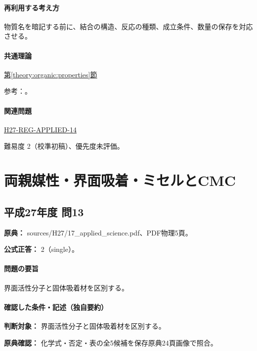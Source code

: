 \paragraph{再利用する考え方} 物質名を暗記する前に、結合の構造、反応の種類、成立条件、数量の保存を対応させる。

\paragraph{共通理論} \hyperref[theory:organic:properties]{第\ref*{theory:organic:properties}節}

\par 参考：\cite{organic_nitro,organic_peroxide}。

\paragraph{関連問題} \hyperref[q:h27-reg-applied-14]{H27-REG-APPLIED-14}

\par 難易度 2（校準初稿）、優先度未評価。

\section{両親媒性・界面吸着・ミセルとCMC}

\subsection{平成27年度 問13}
\label{q:h27-reg-applied-13}

\noindent\textbf{原典：} sources/H27/17\_applied\_science.pdf、PDF物理5頁。

\textbf{公式正答：} 2（single）。

\paragraph{問題の要旨} 界面活性分子と固体吸着材を区別する。

\paragraph{確認した条件・記述（独自要約）}\mbox{}\par

\noindent\textbf{判断対象：} 界面活性分子と固体吸着材を区別する。\par

\noindent\textbf{原典確認：} 化学式・否定・表の全5候補を保存原典24頁画像で照合。\par

